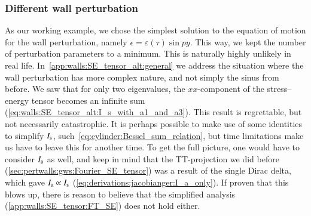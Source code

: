 \subsubsection{Different wall perturbation}
    As our working example, we chose the simplest solution to the equation of motion for the wall perturbation, namely $\epsilon= \varepsilon(\tau)\sin{py}$. This way, we kept the number of perturbation parameters to a minimum. This is naturally highly unlikely in real life. 
    In~\cref{app:walls:SE_tensor_alt:general} we address the situation where the wall perturbation has more complex nature, and not simply the sinus from before. We saw that for only two eigenvalues, the $xx$-component of the stress--energy tensor becomes an infinite sum (\cref{eq:walls:SE_tensor_alt:I_s_with_a1_and_a3}). %
    This result is regrettable, but not necessarily catastrophic. %
    It is perhaps possible to make use of some identities to simplify $I_\mathrm{s}$, such~\cref{eq:cylinder:Bessel_sum_relation}, 
    but time limitations make us have to leave this for another time. To get the full picture, one would have to consider $I_\mathrm{a}$ as well, and keep in mind that the TT-projection we did before (\cref{sec:pertwalls:gws:Fourier_SE_tensor}) was a result of the single Dirac delta, which gave $I_\mathrm{a}\propto I_\mathrm{s}$ (\cref{eq:derivations:jacobianger:I_a_only}). %
    If proven that this blows up, there is reason to believe that the simplified analysis (\cref{app:walls:SE_tensor:FT_SE}) does not hold either. %




